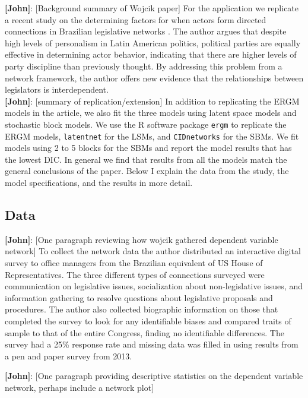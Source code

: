 \documentclass[fleqn,12pt]{wlscirep}
\begin{document}
{\bf [John]}: [Background summary of Wojcik paper] For the application we replicate a recent study on the determining factors for when actors form directed connections in Brazilian legislative networks \citep{wojcik2017legislative}. The author argues that despite high levels of personalism in Latin American politics, political parties are equally effective in determining actor behavior, indicating that there are higher levels of party discipline than previously thought. By addressing this problem from a network framework, the author offers new evidence that the relationships between legislators is interdependent.\\

{\bf [John]}: [summary of replication/extension] In addition to replicating the ERGM models in the article, we also fit the three models using latent space models and stochastic block models. We use the R software package \texttt{ergm} to replicate the ERGM models, \texttt{latentnet} for the LSMs, and \texttt{CIDnetworks} for the SBMs.  We fit models using 2 to 5 blocks for the SBMs and report the model results that has the lowest DIC. In general we find that results from all the models match the general conclusions of the paper. Below I explain the data from the study, the model specifications, and the results in more detail.

\subsection{Data}

{\bf [John]}: [One paragraph reviewing how wojcik gathered dependent variable network] To collect the network data the author distributed an interactive digital survey to office managers from the Brazilian equivalent of US House of Representatives. The three different types of connections surveyed were communication on legislative issues, socialization about non-legislative issues, and information gathering to resolve questions about legislative proposals and procedures. The author also collected biographic information on those that completed the survey to look for any identifiable biases and compared traits of sample to that of the entire Congress, finding no identifiable differences. The survey had a 25\% response rate and missing data was filled in using results from a pen and paper survey from 2013.

{\bf [John]}: [One paragraph providing descriptive statistics on the dependent variable network, perhaps include a network plot]
\end{document}
